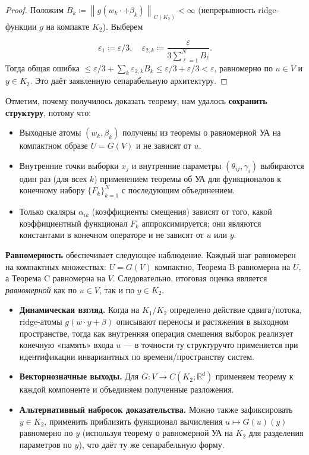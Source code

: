 \documentclass[../NDCNNAI_main.tex]{subfiles}
\begin{document}
\begin{proof}
Положим \( B_k \coloneq  \left\| g(w_k \cdot + \beta_k) \right\|_{C(K_2)} < \infty \) (непрерывность ridge-функции \( g \) на компакте \( K_2 \)). Выберем

\[
\varepsilon_1 \coloneq  \varepsilon/3, \quad \varepsilon_{2,k} \coloneq  \frac{\varepsilon}{3 \sum_{\ell=1}^{N} B_\ell}.
\]
Тогда общая ошибка \( \leq \varepsilon/3 + \sum_{k} \varepsilon_{2,k} B_k \leq \varepsilon/3 + \varepsilon/3 < \varepsilon \), равномерно по \( u \in V \) и \( y \in K_2 \). Это даёт заявленную сепарабельную архитектуру.
\end{proof}

Отметим, почему получилось доказать теорему, нам удалось \textbf{сохранить структуру}, потому что:
\begin{itemize}
    \item Выходные атомы \( (w_k, \beta_k) \) получены из теоремы о равномерной УА на компактном образе \( U = G(V) \) и не зависят от \( u \).

    \item Внутренние точки выборки \( x_j \) и внутренние параметры \( (\theta_{ij}, \gamma_i) \) выбираются один раз (для всех \( k \)) применением теоремы об УА для функционалов к конечному набору \( \{F_k\}_{k=1}^N \) с последующим объединением.

    \item Только скаляры \( \alpha_{ik} \) (коэффициенты смещения) зависят от того, какой коэффициентный функционал \( F_k \) аппроксимируется; они являются константами в конечном операторе и не зависят от \( u \) или \( y \).
\end{itemize}
\textbf{Равномерность} обеспечивает следующее наблюдение.
Каждый шаг равномерен на компактных множествах: \( U = G(V) \) компактно, Теорема B равномерна на \( U \), а Теорема C равномерна на \( V \). Следовательно, итоговая оценка является \textit{равномерной} как по \( u \in V \), так и по \( y \in K_2 \).

\begin{remarks}
    \leavevmode
    \begin{itemize}
    \item  \textbf{Динамическая взгляд.} Когда на \( K_1/K_2 \) определено действие сдвига/потока, ridge-атомы \( g(w \cdot y + \beta) \) описывают переносы и растяжения в выходном пространстве, тогда как внутренняя операция смешения выборок реализует конечную «память» входа \( u \) --- в точности ту структуручто применяется при идентификации инвариантных по времени/пространству систем.

    \item  \textbf{Векторнозначные выходы.} Для \( G \colon V \to C(K_2; \mathbb{R}^d) \) применяем теорему к каждой компоненте и объединяем полученные разложения.

    \item  \textbf{Альтернативный набросок доказательства.} Можно также зафиксировать \( y \in K_2 \), применить приблизить функционал вычисления \( u \mapsto G(u)(y) \) равномерно по \( y \) (используя теорему о равномерной УА на \( K_2 \) для разделения параметров по \( y \)), что даёт ту же сепарабельную форму.
    \end{itemize}    
\end{remarks}
\end{document}
